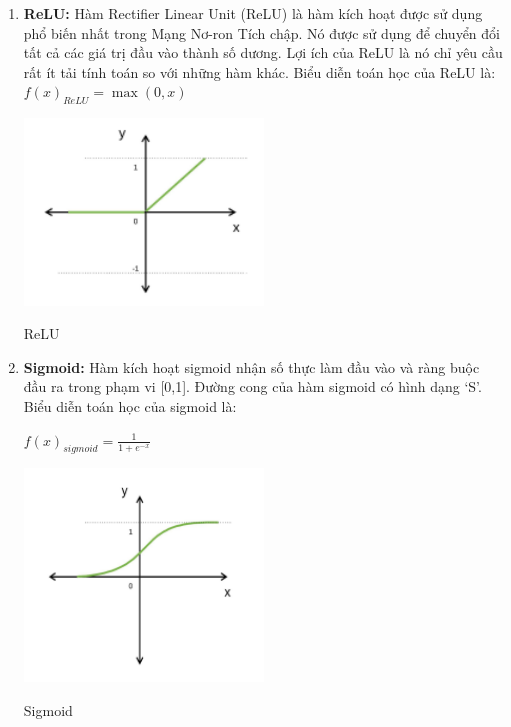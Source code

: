 \begin{enumerate}
    \item \textbf{ReLU:}
    Hàm Rectifier Linear Unit (ReLU) là hàm kích hoạt được sử dụng phổ biến nhất trong Mạng Nơ-ron Tích chập. Nó được sử dụng để chuyển đổi tất cả các giá trị đầu vào thành số dương. Lợi ích của ReLU là nó chỉ yêu cầu rất ít tải tính toán so với những hàm khác. Biểu diễn toán học của ReLU là: \\
    $f(x)_{ReLU} = \max(0, x)$
    \begin{minipage}{\linewidth}
        \captionsetup{type=figure}
        \centering
        \includegraphics[width=0.5\textwidth]{images/relu.png}
        \caption{ReLU}
    \end{minipage}
    \item \textbf{Sigmoid:}
    Hàm kích hoạt sigmoid nhận số thực làm đầu vào và ràng buộc đầu ra trong phạm vi [0,1]. Đường cong của hàm sigmoid có hình dạng ‘S’. Biểu diễn toán học của sigmoid là:

    $f(x)_{sigmoid} = \frac{1}{1 + e^{-x}}$
    \begin{minipage}{\linewidth}
        \captionsetup{type=figure}
        \centering
        \includegraphics[width=0.5\textwidth]{images/sigmoid.png}
        \caption{Sigmoid}
    \end{minipage}

\end{enumerate}

